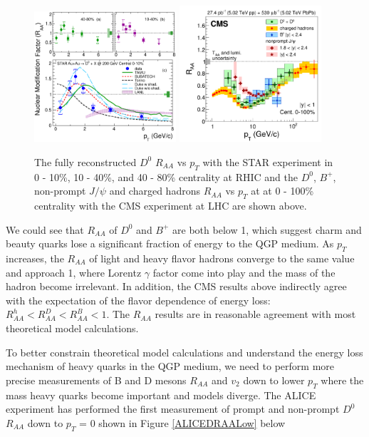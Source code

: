 \begin{figure}[hbtp]
\begin{center}
\includegraphics[width=0.47\textwidth]{Figures/Chapter2/STARRAA.eps}
\includegraphics[width=0.47\textwidth]{Figures/Chapter2/CMSRAA.png}
\caption{The fully reconstructed $D^0$ $R_{AA}$ vs $p_T$ with the STAR experiment in 0 - 10\%, 10 - 40\%, and 40 - 80\% centrality at RHIC and the $D^0$, $B^+$, non-prompt $J/\psi$ and charged hadrons $R_{AA}$ vs $p_T$ at at 0 - 100\% centrality with the CMS experiment at LHC are shown above.}
\label{HQRAA}
\end{center}
\end{figure}   

We could see that $R_{AA}$ of $D^0$ and $B^+$ are both below 1, which suggest charm and beauty quarks lose a significant fraction of energy to the QGP medium. As $p_T$ increases, the $R_{AA}$ of light and heavy flavor hadrons converge to the same value and approach 1, where Lorentz $\gamma$ factor come into play and the mass of the hadron become irrelevant. In addition, the CMS results above indirectly agree with the expectation of the flavor dependence of energy loss: $R_{AA}^{h} < R_{AA}^{D} < R_{AA}^{B} < 1$. The $R_{AA}$ results are in reasonable agreement with most theoretical model calculations. 

To better constrain theoretical model calculations and understand the energy loss mechanism of heavy quarks in the QGP medium, we need to perform more precise measurements of B and D mesons $R_{AA}$ and $v_2$ down to lower $p_T$ where the mass heavy quarks become important and models diverge. The ALICE experiment has performed the first measurement of prompt and non-prompt $D^0$ $R_{AA}$ down to $p_T$ = 0 shown in Figure \ref{ALICEDRAALow} below


